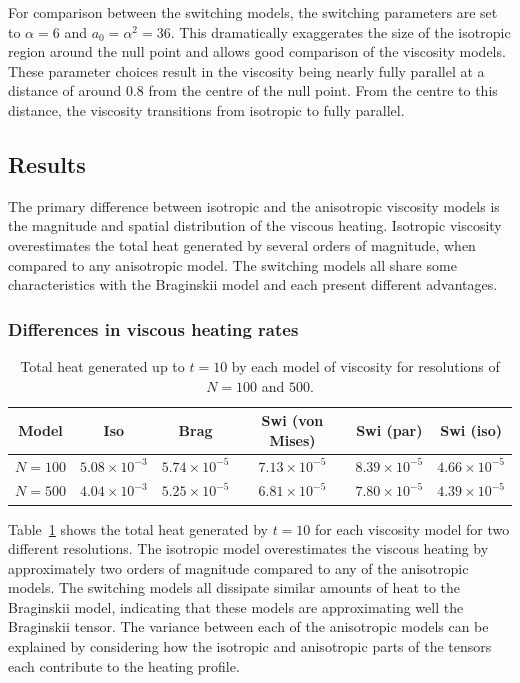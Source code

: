 For comparison between the switching models, the switching parameters are set to $\alpha = 6$ and $a_0 = \alpha^2 = 36$. This dramatically exaggerates the size of the isotropic region around the null point and allows good comparison of the viscosity models. These parameter choices result in the viscosity being nearly fully parallel at a distance of around $0.8$ from the centre of the null point. From the centre to this distance, the viscosity transitions from isotropic to fully parallel.

\subsection{Results}

\label{sec:slow_null_results}

The primary difference between isotropic and the anisotropic viscosity models is the magnitude and spatial distribution of the viscous heating. Isotropic viscosity overestimates the total heat generated by several orders of magnitude, when compared to any anisotropic model. The switching models all share some characteristics with the Braginskii model and each present different advantages.

\subsubsection{Differences in viscous heating rates}

\begin{table}[t]
  \centering
  \caption{Total heat generated up to $t=10$ by each model of viscosity for resolutions of $N=100$ and $500$.}
  \label{tab:slow_null_results_resolution}
  \begin{tabular}{c|ccccc}
Model &  Iso & Brag & Swi (von Mises) & Swi (par) & Swi (iso)\\
\midrule
$N=100$ &  $5.08 \times 10^{-3}$ & $5.74 \times 10^{-5}$ & $7.13 \times 10^{-5}$ & $8.39 \times 10^{-5}$ & $4.66 \times 10^{-5}$\\
$N=500$  &  $4.04 \times 10^{-3}$ & $5.25 \times 10^{-5}$ & $6.81 \times 10^{-5}$ & $7.80 \times 10^{-5}$ & $4.39 \times 10^{-5}$\end{tabular}
\end{table}

Table~\ref{tab:slow_null_results_resolution} shows the total heat generated by $t=10$ for each viscosity model for two different resolutions. The isotropic model overestimates the viscous heating by approximately two orders of magnitude compared to any of the anisotropic models. The switching models all dissipate similar amounts of heat to the Braginskii model, indicating that these models are approximating well the Braginskii tensor. The variance between each of the anisotropic models can be explained by considering how the isotropic and anisotropic parts of the tensors each contribute to the heating profile.

